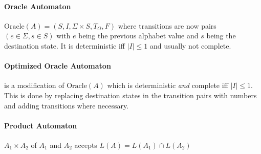 \documentclass{article}
\begin{document}
\paragraph{Oracle Automaton} $\text{Oracle}(A) = (S, I, \Sigma \times S, T_O, F)$ where transitions are now pairs $(e \in \Sigma, s \in S)$ with $e$ being the previous alphabet value and $s$ being the destination state. It is deterministic iff $|I| \leq 1$ and usually not complete.

\paragraph{Optimized Oracle Automaton} is a modification of $\text{Oracle}(A)$ which is deterministic \emph{and} complete iff $|I| \leq 1$. This is done by replacing destination states in the transition pairs with numbers and adding transitions where necessary.

\paragraph{Product Automaton} $A_1 \times A_2$ of $A_1$ and $A_2$ accepts $L(A) = L(A_1) \cap L(A_2)$
\end{document}
